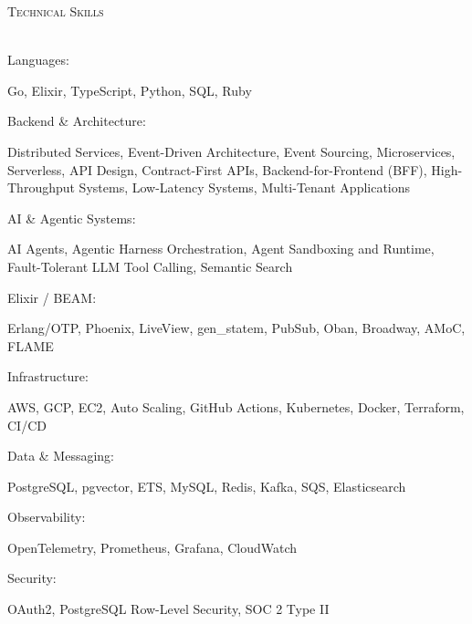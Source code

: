 \documentclass[a4paper]{article}
\newcommand{\lineunder} {
    \vspace*{-8pt} \\
    \hspace*{-18pt} \hrulefill \\
}
\newcommand{\header} [1] {
    {\hspace*{-18pt}\vspace*{6pt} \textsc{#1}}
    \vspace*{-6pt} \lineunder
}
\begin{document}
\header{Technical Skills}
\begingroup
\setlength{\parindent}{0pt}
\noindent\parbox[t]{0.23\textwidth}{\raggedright Languages:}\hfill\parbox[t]{0.75\textwidth}{\raggedright Go, Elixir, TypeScript, Python, SQL, Ruby\par}\par
\vspace{0.35mm}
\noindent\parbox[t]{0.23\textwidth}{\raggedright Backend \& Architecture:}\hfill\parbox[t]{0.75\textwidth}{\raggedright Distributed Services, Event-Driven Architecture, Event Sourcing, Microservices, Serverless, API Design, Contract-First APIs, Backend-for-Frontend (BFF), High-Throughput Systems, Low-Latency Systems, Multi-Tenant Applications\par}\par
\vspace{0.35mm}
\noindent\parbox[t]{0.23\textwidth}{\raggedright AI \& Agentic Systems:}\hfill\parbox[t]{0.75\textwidth}{\raggedright AI Agents, Agentic Harness Orchestration, Agent Sandboxing and Runtime, Fault-Tolerant LLM Tool Calling, Semantic Search\par}\par
\vspace{0.35mm}
\noindent\parbox[t]{0.23\textwidth}{\raggedright Elixir / BEAM:}\hfill\parbox[t]{0.75\textwidth}{\raggedright Erlang/OTP, Phoenix, LiveView, gen\_statem, PubSub, Oban, Broadway, AMoC, FLAME\par}\par
\vspace{0.35mm}
\noindent\parbox[t]{0.23\textwidth}{\raggedright Infrastructure:}\hfill\parbox[t]{0.75\textwidth}{\raggedright AWS, GCP, EC2, Auto Scaling, GitHub Actions, Kubernetes, Docker, Terraform, CI/CD\par}\par
\vspace{0.35mm}
\noindent\parbox[t]{0.23\textwidth}{\raggedright Data \& Messaging:}\hfill\parbox[t]{0.75\textwidth}{\raggedright PostgreSQL, pgvector, ETS, MySQL, Redis, Kafka, SQS, Elasticsearch\par}\par
\vspace{0.35mm}
\noindent\parbox[t]{0.23\textwidth}{\raggedright Observability:}\hfill\parbox[t]{0.75\textwidth}{\raggedright OpenTelemetry, Prometheus, Grafana, CloudWatch\par}\par
\vspace{0.35mm}
\noindent\parbox[t]{0.23\textwidth}{\raggedright Security:}\hfill\parbox[t]{0.75\textwidth}{\raggedright OAuth2, PostgreSQL Row-Level Security, SOC 2 Type II\par}\par
\endgroup
\vspace{2mm}
\end{document}

